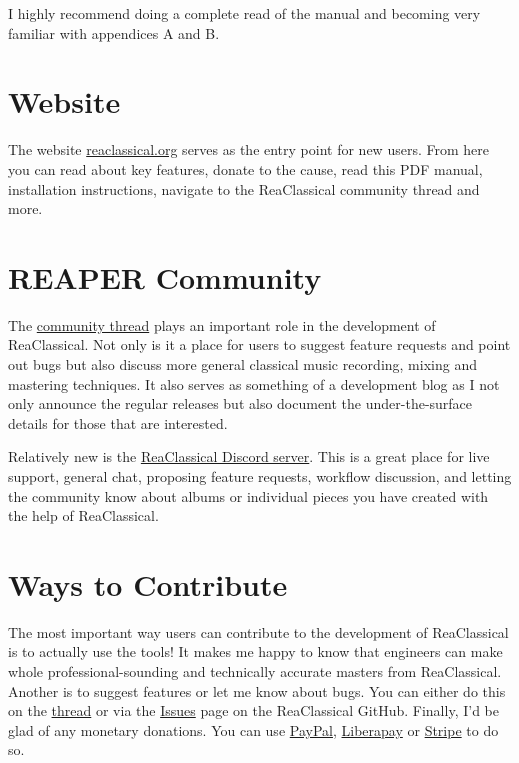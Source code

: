 \documentclass[10pt,american]{article}
\begin{document}
I highly recommend doing a complete read of the manual and becoming very
familiar with appendices A and B.

\section{Website}

The website \href{https://reaclassical.org}{reaclassical.org} serves as the
entry point for new users. From here you can read about key features, donate to
the cause, read this PDF manual, installation instructions, navigate to the
ReaClassical community thread and more.

\section{REAPER Community}

The \href{https://forum.cockos.com/showthread.php?t=265145}{community thread}
plays an important role in the development of ReaClassical. Not only is it a
place for users to suggest feature requests and point out bugs but also discuss
more general classical music recording, mixing and mastering techniques. It also
serves as something of a development blog as I not only announce the regular
releases but also document the under-the-surface details for those that are
interested.

Relatively new is the \href{https://discord.gg/Gu2m9ccHGS}{ReaClassical Discord
server}. This is a great place for live support, general chat, proposing feature
requests, workflow discussion, and letting the community know about albums or
individual pieces you have created with the help of ReaClassical.

\section{Ways to Contribute}

The most important way users can contribute to the development of ReaClassical
is to actually use the tools! It makes me happy to know that engineers can make
whole professional-sounding and technically accurate masters from ReaClassical.
Another is to suggest features or let me know about bugs. You can either do this
on the \href{https://forum.cockos.com/showthread.php?t=265145}{thread} or via
the \href{https://github.com/chmaha/ReaClassical/issues}{Issues} page on the
ReaClassical GitHub. Finally, I'd be glad of any monetary donations. You can use
\href{https://www.paypal.com/donate/?hosted_button_id=PKJLC3E2UPW6C}{PayPal},
\href{https://liberapay.com/reaclassical/}{Liberapay} or
\href{https://donate.stripe.com/00g5mydzCftQdpeaEE}{Stripe} to do so. 
\end{document}

